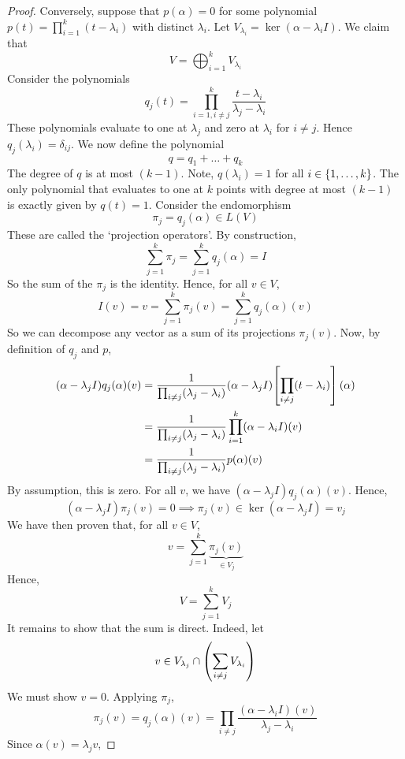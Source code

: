 \begin{proof}
	Conversely, suppose that \( p(\alpha) = 0 \) for some polynomial \( p(t) = \prod_{i=1}^k (t-\lambda_i) \) with distinct \( \lambda_i \).
	Let \( V_{\lambda_i} = \ker(\alpha - \lambda_i I) \).
	We claim that
	\[
		V = \bigoplus_{i=1}^k V_{\lambda_i}
	\]
	Consider the polynomials
	\[
		q_j(t) = \prod_{i=1,i \neq j}^k \frac{t-\lambda_i}{\lambda_j - \lambda_i}
	\]
	These polynomials evaluate to one at \( \lambda_j \) and zero at \( \lambda_i \) for \( i \neq j \).
	Hence \( q_j(\lambda_i) = \delta_{ij} \).
	We now define the polynomial
	\[
		q = q_1 + \dots + q_k
	\]
	The degree of \( q \) is at most \( (k-1) \).
	Note, \( q(\lambda_i) = 1 \) for all \( i \in \qty{1, \dots, k} \).
	The only polynomial that evaluates to one at \( k \) points with degree at most \( (k-1) \) is exactly given by \( q(t) = 1 \).
	Consider the endomorphism
	\[
		\pi_j = q_j(\alpha) \in L(V)
	\]
	These are called the `projection operators'.
	By construction,
	\[
		\sum_{j=1}^k \pi_j = \sum_{j=1}^k q_j(\alpha) = I
	\]
	So the sum of the \( \pi_j \) is the identity.
	Hence, for all \( v \in V \),
	\[
		I(v) = v = \sum_{j=1}^k \pi_j(v) = \sum_{j=1}^k q_j(\alpha)(v)
	\]
	So we can decompose any vector as a sum of its projections \( \pi_j(v) \).
	Now, by definition of \( q_j \) and \( p \),
	\begin{align*}
		(\alpha - \lambda_j I) q_j(\alpha)(v) & = \frac{1}{\prod_{i \neq j} (\lambda_j - \lambda_i)} (\alpha - \lambda_j I) \qty[\prod_{i \neq j} (t - \lambda_i)] (\alpha) \\
		                                      & = \frac{1}{\prod_{i \neq j} (\lambda_j - \lambda_i)} \prod_{i=1}^k (\alpha - \lambda_i I)(v)                                \\
		                                      & = \frac{1}{\prod_{i \neq j} (\lambda_j - \lambda_i)} p(\alpha)(v)
	\end{align*}
	By assumption, this is zero.
	For all \( v \), we have \( (\alpha - \lambda_j I) q_j(\alpha)(v) \).
	Hence,
	\[
		(\alpha - \lambda_j I) \pi_j(v) = 0 \implies \pi_j(v) \in \ker(\alpha - \lambda_j I) = v_j
	\]
	We have then proven that, for all \( v \in V \),
	\[
		v = \sum_{j=1}^k \underbrace{\pi_j(v)}_{\in V_j}
	\]
	Hence,
	\[
		V = \sum_{j=1}^k V_j
	\]
	It remains to show that the sum is direct.
	Indeed, let
	\[
		v \in V_{\lambda_j} \cap \qty(\sum_{i \neq j} V_{\lambda_i})
	\]
	We must show \( v = 0 \).
	Applying \( \pi_j \),
	\[
		\pi_j(v) = q_j(\alpha)(v) = \prod_{i \neq j} \frac{(\alpha - \lambda_i I)(v)}{\lambda_j - \lambda_i}
	\]
	Since \( \alpha(v) = \lambda_j v \),

\end{proof}
